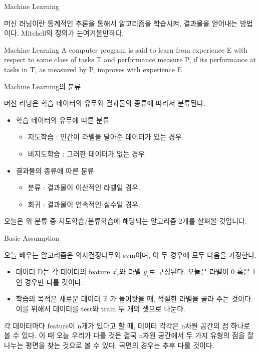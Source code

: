 \documentclass{beamer}
\begin{document}
\begin{frame}{Machine Learning}

머신 러닝이란 통계적인 추론을 통해서 알고리즘을 학습시켜, 결과물을 얻어내는 방법이다. Mitchell의 정의가 눈여겨볼만하다. 
\begin{block}{Machine Learning}
A computer program is said to learn from experience E with respect to some class of tasks T and performance measure P, if its performance at tasks in T, as measured by P, improves with experience E
\end{block} 

\end{frame}

\begin{frame}{Machine Learning의 분류}

머신 러닝은 학습 데이터의 유무와 결과물의 종류에 따라서 분류된다. 
\begin{itemize}
\item 학습 데이터의 유무에 따른 분류
\begin{itemize} 
\item 지도학습 : 인간이 라벨을 달아준 데이터가 있는 경우. 
\item 비지도학습 : 그러한 데이터가 없는 경우 
\end{itemize}
\item 결과물의 종류에 따른 분류
\begin{itemize} 
\item 분류 : 결과물이 이산적인 라벨일 경우. 
\item 회귀 : 결과물이 연속적인 실수일 경우. 
\end{itemize}
\end{itemize}

오늘은 위 분류 중 지도학습/분류학습에 해당되는 알고리즘 2개를 살펴볼 것입니다. 

\end{frame}


\begin{frame}{Basic Assumption}

오늘 배우는 알고리즘은 의사결정나무와 svm이며, 이 두 경우에 모두 다음을 가정한다. 

\begin{itemize} 
\item 데이터 D는 각 데이터의 feature $\vec{x}_i$와 라벨 $y_i$로 구성된다. 오늘은 라벨이 0 혹은 1인 경우만 다룰 것이다. 
\item 학습의 목적은 새로운 데이터 $\vec{z}$ 가 들어왓을 때, 적절한 라벨을 골라 주는 것이다. 이를 위해서 데이터를 test와 train 두 개의 셋으로 나눈다. 
\end{itemize}

각 데이터마다 feature이 n개가 있다고 할 때, 데이터 각각은 n차원 공간의 점 하나로 볼 수 있다. 이 때 오늘 우리가 다룰 것은 결국 n차원 공간에서 두 가지 유형의 점을 잘 나누는 평면을 찾는 것으로 볼 수 있다. 곡면의 경우는 추후 다룰 것이다. 
\end{frame}
\end{document}
